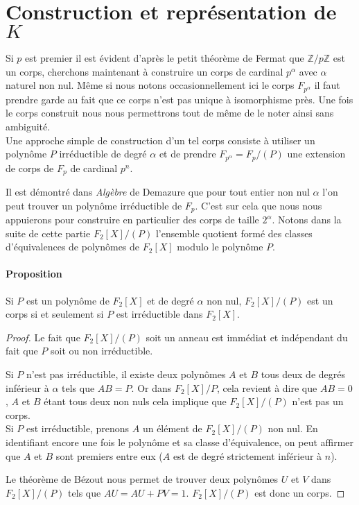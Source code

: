 \documentclass[10pt]{article}
\begin{document}
\section{Construction et représentation de $K$}


Si $p$ est premier il est évident d'après le petit théorème de Fermat que $\mathbb{Z}/p \mathbb{Z}$ est un corps, cherchons maintenant à construire un corps de cardinal $p^{\alpha}$ avec $\alpha$ naturel non nul.
Même si nous notons occasionnellement ici le corps $F_{p^{\alpha}}$ il faut prendre garde au fait que ce corps n'est pas unique à isomorphisme près. %
Une fois le corps construit nous nous permettrons tout de même de le noter ainsi sans ambiguité.\\
Une approche simple de construction d'un tel corps consiste à utiliser un polynôme $P$ irréductible de degré $\alpha$ et de prendre $F_{p^{\alpha}}=F_p/(P)$ une extension de corps de $F_p$ de cardinal $p^n$.

Il est démontré dans \textit{Algèbre} de Demazure que pour tout entier non nul $\alpha$ l'on peut trouver un polynôme irréductible de $F_p$. C'est sur cela que nous nous appuierons pour construire en particulier des corps de taille $2^{\alpha}$. Notons dans la suite de cette partie $F_2[X] / (P)$ l'ensemble quotient formé des classes d'équivalences de polynômes de $F_2[X]$ modulo le polynôme $P$.

\paragraph{Proposition} Si $P$ est un polynôme de $F_2[X]$ et de degré $\alpha$ non nul, $F_2[X]/(P)$ est un corps si et seulement si $P$ est irréductible dans $F_2[X]$.

\begin{proof}
Le fait que $F_2[X]/(P)$ soit un anneau est immédiat et indépendant du fait que $P$ soit ou non irréductible.

Si $P$ n'est pas irréductible, il existe deux polynômes $A$ et $B$ tous deux de degrés inférieur à $\alpha$ tels que $AB=P$. Or dans $F_2[X]/P$, cela revient à dire que $AB=0$, $A$ et $B$ étant tous deux non nuls cela implique que $F_2[X]/(P)$ n'est pas un corps.\\


Si $P$ est irréductible, prenons $A$ un élément de $F_2[X]/(P)$ non nul. En identifiant encore une fois le polynôme et sa classe d'équivalence, on peut affirmer que $A$ et $B$ sont premiers entre eux ($A$ est de degré strictement inférieur à $n$).

Le théorème de Bézout nous permet de trouver deux polynômes $U$ et $V$ dans $F_2[X]/(P)$ tels que $AU=AU+PV=1$. $F_2[X]/(P)$ est donc un corps.
\end{proof}
\end{document}
